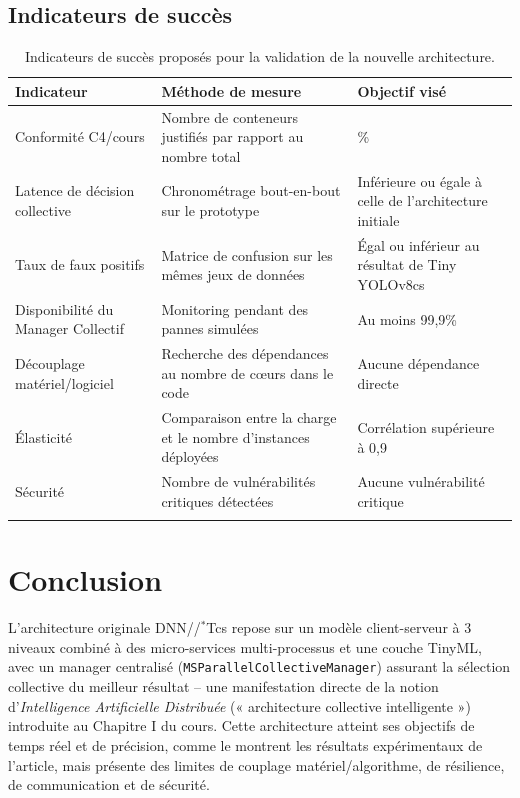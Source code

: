 \documentclass[11pt,a4paper]{article}
\begin{document}
\subsection{Indicateurs de succès}
\renewcommand{\arraystretch}{1.25}
\begin{longtable}{|>{\raggedright\arraybackslash}p{3.8cm}|
                  >{\raggedright\arraybackslash}p{5.3cm}|
                  >{\raggedright\arraybackslash}p{4.2cm}|}
\hline
\textbf{Indicateur} & \textbf{Méthode de mesure} & \textbf{Objectif visé} \\
\hline
\endhead
Conformité C4/cours & Nombre de conteneurs justifiés par rapport au nombre total & 100\% \\ \hline
Latence de décision collective & Chronométrage bout-en-bout sur le prototype & Inférieure ou égale à celle de l'architecture initiale \\ \hline
Taux de faux positifs & Matrice de confusion sur les mêmes jeux de données & Égal ou inférieur au résultat de Tiny YOLOv8cs \\ \hline
Disponibilité du Manager Collectif & Monitoring pendant des pannes simulées & Au moins 99,9\% \\ \hline
Découplage matériel/logiciel & Recherche des dépendances au nombre de cœurs dans le code & Aucune dépendance directe \\ \hline
Élasticité & Comparaison entre la charge et le nombre d'instances déployées & Corrélation supérieure à 0,9 \\ \hline
Sécurité & Nombre de vulnérabilités critiques détectées & Aucune vulnérabilité critique \\ \hline
\caption{Indicateurs de succès proposés pour la validation de la nouvelle architecture.}
\end{longtable}
\renewcommand{\arraystretch}{1}

\newpage
\section{Conclusion}
L'architecture originale DNN//$^{*}$Tcs repose sur un modèle client-serveur à 3 niveaux combiné à des micro-services multi-processus et une couche TinyML, avec un manager centralisé (\texttt{MSParallelCollectiveManager}) assurant la sélection collective du meilleur résultat -- une manifestation directe de la notion d'\emph{Intelligence Artificielle Distribuée} (« architecture collective intelligente ») introduite au Chapitre I du cours. Cette architecture atteint ses objectifs de temps réel et de précision, comme le montrent les résultats expérimentaux de l'article, mais présente des limites de couplage matériel/algorithme, de résilience, de communication et de sécurité.
\end{document}
